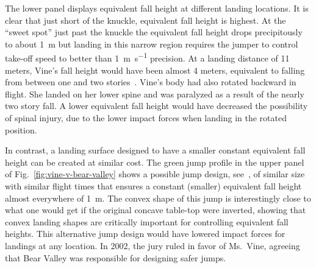 \documentclass[smallextended]{svjour3}       %
\begin{document}
The lower panel displays equivalent fall height at different landing locations.
It is clear that just short of the knuckle, equivalent fall height is highest.
At the ``sweet spot'' just past the knuckle the equivalent fall height drops
precipitously to  about 1~\si{\meter} but landing in this narrow region
requires the jumper to control take-off speed to better than
1~\si{\meter\per\second} precision. At a landing distance of 11 meters, Vine's
fall height would have been almost 4 meters, equivalent to falling from between
one and two stories~\cite{Vish2005}. Vine's body had also rotated backward in
flight. She landed on her lower spine and was paralyzed as a result of the
nearly two story fall. A lower equivalent fall height would have decreased the
possibility of spinal injury, due to the lower impact forces when landing in
the rotated position.

In contrast, a landing surface designed to have a smaller constant equivalent
fall height can be created at similar cost. The
green jump profile in the upper panel of Fig.~\ref{fig:vine-v-bear-valley}
shows a possible jump design, see~\cite{Levy2015}, of similar size with similar
flight times that ensures a constant (smaller) equivalent fall height almost
everywhere of 1~\si{\meter}. The convex shape of this jump is interestingly
close to what one would get if the original concave table-top were inverted,
showing that convex landing shapes are critically important for controlling equivalent fall heights. This alternative jump design would have lowered impact
forces for landings at any location. In 2002, the jury ruled in favor of
Ms.~Vine, agreeing that Bear Valley was responsible for designing safer jumps.
\end{document}
